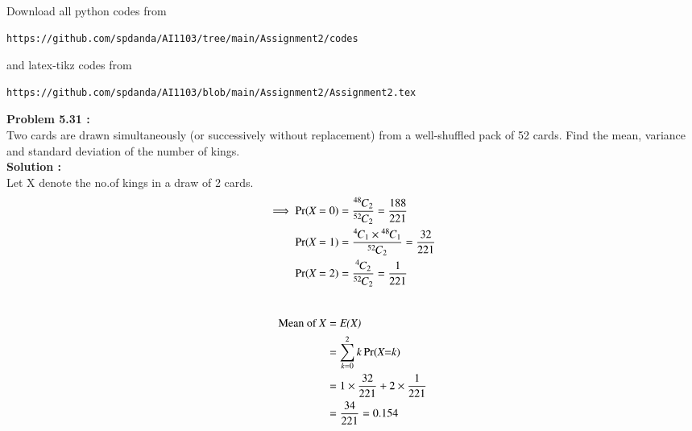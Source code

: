 \documentclass[journal,12pt,twocolumn]{IEEEtran}
\newcommand*{\permcomb}[4][0mu]{{{}^{#3}\mkern#1#2_{#4}}}
\newcommand*{\comb}[1][-1mu]{\permcomb[#1]{C}}
\begin{document}
\maketitle
\newpage
\bigskip
\renewcommand{\thefigure}{\theenumi}
\renewcommand{\thetable}{\theenumi}
Download all python codes from 
\begin{lstlisting}
https://github.com/spdanda/AI1103/tree/main/Assignment2/codes
\end{lstlisting}
%
and latex-tikz codes from 
%
\begin{lstlisting}
https://github.com/spdanda/AI1103/blob/main/Assignment2/Assignment2.tex
\end{lstlisting}
\large\textbf{Problem 5.31 :}\\
Two cards are drawn simultaneously (or successively without replacement) from a well-shuffled  pack  of  52  cards.  Find  the  mean, variance and standard deviation of the number of kings.\\
\textbf{Solution :}\\
Let X denote the no.of kings in a draw of 2 cards.
\begin{align}
\implies \Pr(\emph{X}=0) &= \dfrac{\comb{48}{2}}{\comb{52}{2}}=\dfrac{188}{221} \\
\Pr(\emph{X}=1) &= \dfrac{{\comb{4}{1}} \times {\comb{48}{1}}}{{\comb{52}{2}}}=\dfrac{32}{221} \\ 
\Pr(\emph{X}=2)&=\dfrac{\comb{4}{2}}{\comb{52}{2}}= \dfrac{1}{221}\\ \nonumber
\end{align}

\begin{center}
\begin{table}[h]
    \centering
    \caption{\large Probability distribution table }
    \label{Table 1}
\end{table}
\end{center}

\newpage

\begin{align}
 \text{Mean of \emph{X}}&= \emph{E(X)} \\  
               &=\sum_{\emph{k}=0}^{2}   k\Pr(\emph{X=k})\\ 
               &=1 \times\frac{32}{221}+2 \times\frac{1}{221}\\
               &= \frac{34}{221} = 0.154\\ \nonumber
\end{align}
\end{document}

